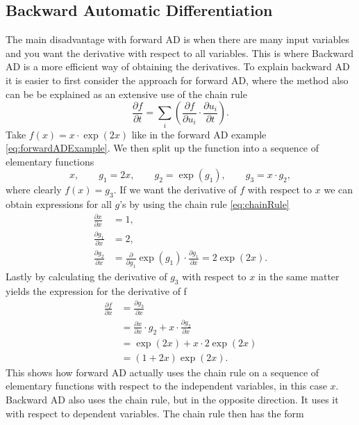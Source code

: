 \subsection{Backward Automatic Differentiation}
\label{sec:BackwardAD}
The main disadvantage with forward AD is when there are many input variables and you want the derivative with respect to all variables. This is where Backward AD is a more efficient way of obtaining the derivatives. To explain backward AD it is easier to first consider the approach for forward AD, where the method also can be be explained as an extensive use of the chain rule
\begin{equation}
    \label{eq:chainRule}
    \frac{\partial f}{\partial t} = \sum_i\left(\frac{\partial f}{\partial u_i}\cdot\frac{\partial u_i}{\partial t}\right).
\end{equation}
Take $f(x) = x\cdot\exp(2x)$ like in the forward AD example \eqref{eq:forwardADExample}. We then split up the function into a sequence of elementary functions
\begin{equation}
    \label{eq:BackwardADSeperationSimple}
    x, \hspace{2em} g_1 = 2x, \hspace{2em} g_2 = \exp(g_1), \hspace{2em} g_3 = x\cdot g_2,
\end{equation}
where clearly $f(x) = g_3$. If we want the derivative of $f$ with respect to $x$ we can obtain expressions for all $g$'s by using the chain rule \eqref{eq:chainRule}
\begin{align*}
     \frac{\partial x}{\partial x} &= 1, \\
     \frac{\partial g_1}{\partial x} &= 2, \\
     \frac{\partial g_2}{\partial x} &= \frac{\partial}{\partial g_1}\exp(g_1)\cdot\frac{\partial g_1}{\partial x} = 2\exp(2x).
\end{align*}
Lastly by calculating the derivative of $g_3$ with respect to $x$ in the same matter yields the expression for the derivative of f
\begin{align*}
    \frac{\partial f}{\partial x} &= \frac{\partial g_3}{\partial x}\\
    &=\frac{\partial x}{\partial x}\cdot g_2 + x\cdot\frac{\partial g_2}{\partial x}\\
    &= \exp(2x) + x\cdot 2\exp(2x) \\
    &= (1+2x)\exp(2x).
\end{align*}
This shows how forward AD actually uses the chain rule on a sequence of elementary functions with respect to the independent variables, in this case $x$. Backward AD also uses the chain rule, but in the opposite direction. It uses it with respect to dependent variables. The chain rule then has the form
